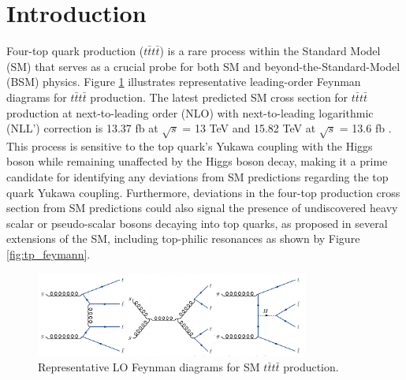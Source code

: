 \documentclass[twoside]{article}
\begin{document}
\pagestyle{fancy}
\fancyhf{}
\fancyhead[LE]{\nouppercase{\rightmark\hfill\leftmark}}
\fancyhead[RO]{\nouppercase{\leftmark\hfill\rightmark}}
\fancyfoot[LE,RO]{\hfill\thepage\hfill}


\section{Introduction}
Four-top quark production ($t\bar{t}t\bar{t}$) is a rare process within the Standard Model (SM) that serves as a crucial probe for both SM and beyond-the-Standard-Model (BSM) physics. Figure \ref{fig:ftop_feymann} illustrates representative leading-order Feynman diagrams for $t\bar{t}t\bar{t}$ production. The latest predicted SM cross section for $t\bar{t}t\bar{t}$ production at next-to-leading order (NLO) with next-to-leading logarithmic (NLL') correction is 13.37 fb at $\sqrt{s}$ = 13 TeV and 15.82 TeV at $\sqrt{s}$ = 13.6 fb \cite{ftop_xsec}. This process is sensitive to the top quark's Yukawa coupling with the Higgs boson while remaining unaffected by the Higgs boson decay, making it a prime candidate for identifying any deviations from SM predictions regarding the top quark Yukawa coupling. Furthermore, deviations in the four-top production cross section from SM predictions could also signal the presence of undiscovered heavy scalar or pseudo-scalar bosons decaying into top quarks, as proposed in several extensions of the SM, including top-philic resonances as shown by Figure \ref{fig:tp_feymann}.\\

\begin{figure}[h!]
    \centering
    \includegraphics[width=0.8\textwidth]{plots/ftop_feymann.png}
    \caption{Representative LO Feynman diagrams for SM $t\bar{t}t\bar{t}$ production.}
    \label{fig:ftop_feymann}
\end{figure}
\end{document}
